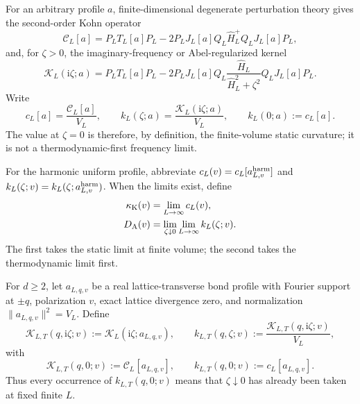 \documentclass[11pt]{article}
\theoremstyle{definition}
\theoremstyle{remark}
\newcommand{\cK}{\mathcal K}
\newcommand{\cC}{\mathcal C}
\newcommand{\I}{\mathrm i}
\newcommand{\norm}[1]{\lVert #1\rVert}
\begin{document}
For an arbitrary profile $a$, finite-dimensional degenerate perturbation theory gives the second-order
Kohn operator
\begin{equation}
 \cC_L[a]
 =P_LT_L[a]P_L-2P_LJ_L[a]Q_L\widehat H_L^+Q_LJ_L[a]P_L,
 \label{eq:Kohn-operator}
\end{equation}
and, for $\zeta>0$, the imaginary-frequency or Abel-regularized kernel
\begin{equation}
 \cK_L(\I\zeta;a)
 =P_LT_L[a]P_L
 -2P_LJ_L[a]Q_L\frac{\widehat H_L}{\widehat H_L^2+\zeta^2}Q_LJ_L[a]P_L.
 \label{eq:Abelian-kernel}
\end{equation}
Write
\begin{equation}
 c_L[a]=\frac{\cC_L[a]}{V_L},
 \qquad
 k_L(\zeta;a)=\frac{\cK_L(\I\zeta;a)}{V_L},
 \qquad
 k_L(0;a):=c_L[a].
 \label{eq:profile-normalized}
\end{equation}
The value at $\zeta=0$ is therefore, by definition, the finite-volume static curvature; it is not a
thermodynamic-first frequency limit.

For the harmonic uniform profile, abbreviate
$c_L(v)=c_L[a^{\rm harm}_{L,v}]$ and
$k_L(\zeta;v)=k_L(\zeta;a^{\rm harm}_{L,v})$.  When the limits exist, define
\begin{align}
 \kappa_{\rm K}(v)&=\lim_{L\to\infty}c_L(v),
 \label{eq:kappaK}\\
 D_{\rm A}(v)&=\lim_{\zeta\downarrow0}\lim_{L\to\infty}k_L(\zeta;v).
 \label{eq:DA}
\end{align}
The first takes the static limit at finite volume; the second takes the thermodynamic limit first.

For $d\ge2$, let $a_{L,q,v}$ be a real lattice-transverse bond profile with Fourier support at $\pm q$,
polarization $v$, exact lattice divergence zero, and normalization
$\norm{a_{L,q,v}}^2=V_L$.  Define
\begin{equation}
 \cK_{L,T}(q,\I\zeta;v):=\cK_L(\I\zeta;a_{L,q,v}),
 \qquad
 k_{L,T}(q,\zeta;v):=\frac{\cK_{L,T}(q,\I\zeta;v)}{V_L},
 \label{eq:finite-q-kernel}
\end{equation}
with
\begin{equation}
 \cK_{L,T}(q,0;v):=\cC_L[a_{L,q,v}],
 \qquad
 k_{L,T}(q,0;v):=c_L[a_{L,q,v}].
 \label{eq:finite-q-static-convention}
\end{equation}
Thus every occurrence of $k_{L,T}(q,0;v)$ means that $\zeta\downarrow0$ has already been taken at
fixed finite $L$.
\end{document}
